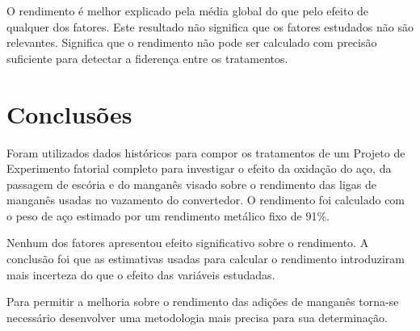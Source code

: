 		O rendimento é melhor explicado pela média global do que pelo efeito de qualquer dos fatores. Este resultado não significa que os fatores estudados não são relevantes. Significa que o rendimento não pode ser calculado com precisão suficiente para detectar a fiderença entre os tratamentos.
\section{Conclusões}
		Foram utilizados dados históricos para compor os tratamentos de um Projeto de Experimento fatorial completo para investigar o efeito da oxidação do aço, da passagem de escória e do manganês visado sobre o rendimento das ligas de manganês usadas no vazamento do convertedor. O rendimento foi calculado com o peso de aço estimado por um rendimento metálico fixo de 91\%.
		
		Nenhum dos fatores apresentou efeito significativo sobre o rendimento. A conclusão foi que as estimativas usadas para calcular o rendimento introduziram mais incerteza do que o efeito das variáveis estudadas.
		
		Para permitir a melhoria sobre o rendimento das adições de manganês torna-se necessário desenvolver uma metodologia mais precisa para sua determinação.
